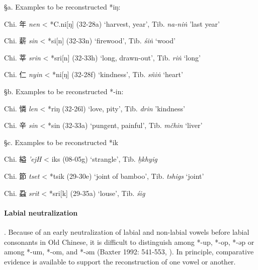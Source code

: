 §a. Examples to be reconstructed *iŋ:

\begin{description}
\item
Chi. 年 \emph{nen} \textless{} *C.n{}i{[}ŋ] (32-28a) `harvest, year',
Tib. {} \emph{na-niṅ }'last year'
\item
Chi. 薪 \emph{sin} \textless{} *si[n] (32-33n) `firewood', Tib. {} \emph{śiṅ} `wood'

\item
Chi. 莘 \emph{srin} \textless{} *sri[n] (32-33h) `long, drawn-out',
Tib. {} \emph{riṅ} `long'

\item
Chi. 仁  \emph{nyin} \textless{} *ni{[}ŋ] (32-28f) `kindness', Tib.{} \emph{sñiṅ} `heart'
\end{description}

§b. Examples to be reconstructed *-in:

\begin{description} \item
Chi. 憐 \emph{len} \textless{} *r{}iŋ (32-26l) `love, pity', Tib. {} \emph{drin }'kindness'
\end{description}

\begin{description} \item
Chi. 辛 \emph{sin} \textless{} *sin (32-33a) `pungent, painful', Tib. {} \emph{mčhin} `liver'
\end{description}

§c. Examples to be reconstructed *ik

\begin{description} \item
Chi. 縊 \emph{'ejH} \textless{} {}iks (08-05g) `strangle', Tib. {} \emph{ḫkhyig}

\item
Chi. 節 \emph{tset} \textless{} *ts{}ik (29-30e) `joint of bamboo', Tib. {} \emph{tshigs} `joint'

\item
Chi. 蝨 \emph{srit} \textless{} *sri{[}k] (29-35a) `louse', Tib. {} \emph{śig}
\end{description}

\paragraph{Labial neutralization}. Because of
an early neutralization of labial and non-labial vowels before labial
consonants in Old Chinese, it is difficult to distinguish among *-up,
*-op, *-əp or among *-um, *-om, and *-əm (Baxter 1992: 541-553, 
\cite[306]{Baxter2014OldChinese}). In principle, comparative evidence is available to
support the reconstruction of one vowel or another.

